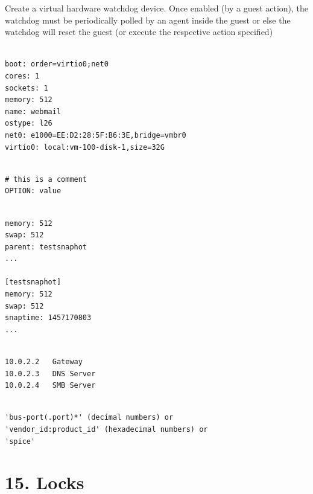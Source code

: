 Create a virtual hardware watchdog device. Once enabled (by a guest action), the watchdog must be periodically polled by an agent inside the guest or else the watchdog will reset the guest (or execute the respective action specified)

\begin{lstlisting}

boot: order=virtio0;net0
cores: 1
sockets: 1
memory: 512
name: webmail
ostype: l26
net0: e1000=EE:D2:28:5F:B6:3E,bridge=vmbr0
virtio0: local:vm-100-disk-1,size=32G

\end{lstlisting}

\begin{lstlisting}

# this is a comment
OPTION: value

\end{lstlisting}

\begin{lstlisting}

memory: 512
swap: 512
parent: testsnaphot
...

[testsnaphot]
memory: 512
swap: 512
snaptime: 1457170803
...

\end{lstlisting}

\begin{lstlisting}

10.0.2.2   Gateway
10.0.2.3   DNS Server
10.0.2.4   SMB Server

\end{lstlisting}

\begin{lstlisting}

'bus-port(.port)*' (decimal numbers) or
'vendor_id:product_id' (hexadecimal numbers) or
'spice'

\end{lstlisting}

\begin{table}[htbp]

\centering

\begin{tabular}

\end{tabular}

\end{table}


\section{15. Locks}

